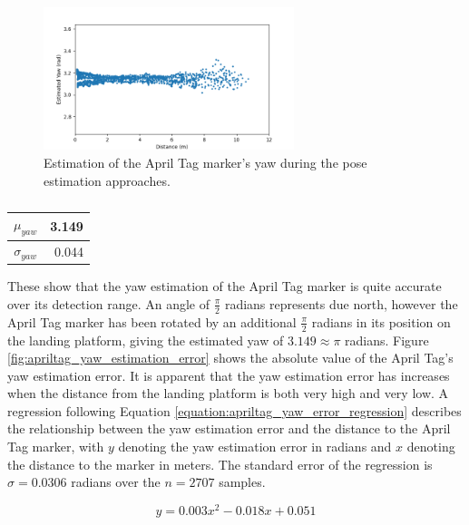 \begin{figure}[h]
    \centering
    \includegraphics[width=0.65\textwidth]{images/apriltag_yaw_estimation.png}
    \caption{Estimation of the April Tag marker's yaw during the pose estimation approaches.}
    \label{fig:apriltag_yaw_estimation}
\end{figure}

\vspace{-0.25cm}
\begin{table}[ht]
    \centering
    \begin{tabular}{|c|r|}
    \hline
        $\mu_{yaw}$  & 3.149 \\\hline
        $\sigma_{yaw}$ & 0.044 \\\hline
    \end{tabular}
    \caption{}
    \label{tab:apriltag_yaw_stats}
\end{table}

\vspace{-0.25cm}
These show that the yaw estimation of the April Tag marker is quite accurate over its detection range. An angle of $\frac{\pi}{2}$ radians represents due north, however the April Tag marker has been rotated by an additional $\frac{\pi}{2}$ radians in its position on the landing platform, giving the estimated yaw of $3.149 \approx \pi$ radians. Figure \ref{fig:apriltag_yaw_estimation_error} shows the absolute value of the April Tag's yaw estimation error. It is apparent that the yaw estimation error has increases when the distance from the landing platform is both very high and very low. A regression following Equation \ref{equation:apriltag_yaw_error_regression} describes the relationship between the yaw estimation error and the distance to the April Tag marker, with $y$ denoting the yaw estimation error in radians and $x$ denoting the distance to the marker in meters. The standard error of the regression is $\sigma=0.0306$ radians over the $n=2707$ samples.

\begin{equation}
    y=0.003x^2-0.018x+0.051
    \label{equation:apriltag_yaw_error_regression}
\end{equation}

